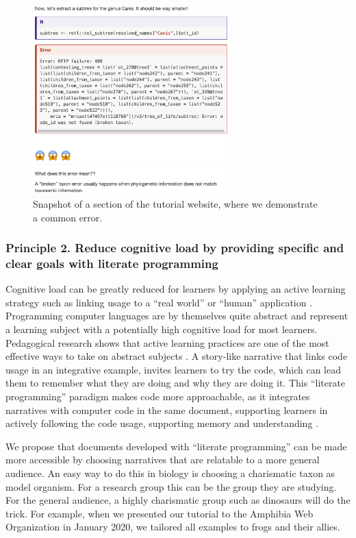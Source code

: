 \documentclass[12pt]{article}
\begin{document}
\begin{figure}
\begin{center}
\includegraphics[width=3in]{fig-error.png}
\end{center}
\caption{Snapshot of a section of the tutorial website, where we demonstrate a common error. \label{fig:error}}
\end{figure}

\subsubsection*{Principle 2. Reduce cognitive load by providing specific and clear goals
with literate programming}

Cognitive load can be greatly reduced for learners by applying an active learning
strategy such as linking usage to a ``real world'' or ``human'' application
\citep{felder2009active}.
Programming computer languages are by themselves quite abstract and represent a
learning subject with a potentially high cognitive load for most learners.
Pedagogical research shows that active learning practices are one of the most effective
ways to take on abstract subjects \citep{freeman2014active}.
A story-like narrative that links code usage in an integrative example, invites learners
to try the code, which can lead them to remember what they are doing and
why they are doing it.
This ``literate programming'' paradigm \citep{knuth1984literate, fritzson2002mathmodelica}
makes code more approachable, as it integrates narratives with computer code in
the same document, supporting learners in actively following
the code usage, supporting memory and understanding \citep{piccolo2016tools}.

We propose that documents developed with ``literate programming'' can be made more
accessible by choosing narratives that are relatable to a more general audience.
An easy way to do this in biology is choosing a charismatic taxon as model organism.
For a research group this can be the group they are studying. For the general audience,
a highly charismatic group such as dinosaurs will do the trick.
For example, when we presented our tutorial to the Amphibia Web Organization \citep{van2002amphibiaweb}
in January 2020, we tailored all examples to frogs and their allies.
\end{document}
